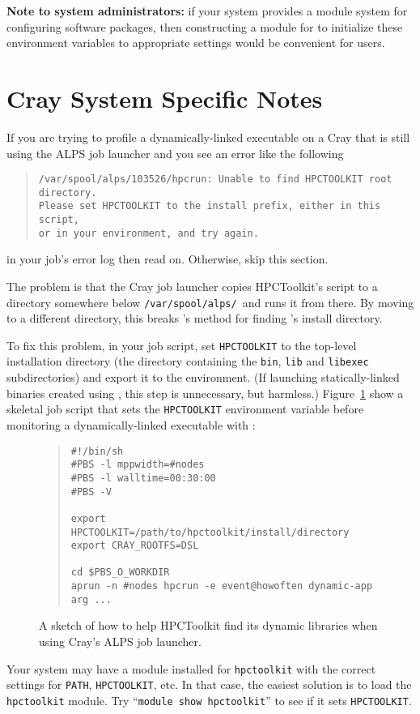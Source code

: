 {\bf Note to system administrators:} if your system provides a module system for configuring 
software packages, then constructing
a module for \HPCToolkit{} to initialize these environment variables to appropriate settings
would be convenient for users.

\section{Cray System Specific Notes}
\label{sec:platform-specific}

%
%

If you are trying to profile a dynamically-linked executable on a Cray that is still using the ALPS job launcher and you see an error like the following 

\begin{quote}
\begin{verbatim}
/var/spool/alps/103526/hpcrun: Unable to find HPCTOOLKIT root directory.
Please set HPCTOOLKIT to the install prefix, either in this script,
or in your environment, and try again.
\end{verbatim}
\end{quote}

\noindent 
in your job's error log then read on. Otherwise, skip this section.

The problem is that the Cray job launcher copies HPCToolkit's \hpcrun{}
script to a directory somewhere below \verb|/var/spool/alps/|\ and runs
it from there.  By moving \hpcrun{} to a different directory, this
breaks \hpcrun{}'s method for finding \HPCToolkit{}'s install directory.

To fix this problem, in your job script, set \verb|HPCTOOLKIT| to the top-level \HPCToolkit{} installation directory
(the directory containing the \verb|bin|, \verb|lib| and
\verb|libexec| subdirectories) and export it to the environment.  
(If launching statically-linked binaries created using \hpclink{}, this step is unnecessary, but harmless.)
Figure~\ref{cray-alps} show a skeletal job script that sets the \verb|HPCTOOLKIT| environment variable  before monitoring 
a dynamically-linked executable with \hpcrun{}: 

\begin{figure}
\begin{quote}
\begin{verbatim}
#!/bin/sh
#PBS -l mppwidth=#nodes
#PBS -l walltime=00:30:00
#PBS -V

export HPCTOOLKIT=/path/to/hpctoolkit/install/directory
export CRAY_ROOTFS=DSL

cd $PBS_O_WORKDIR
aprun -n #nodes hpcrun -e event@howoften dynamic-app arg ...
\end{verbatim}
\end{quote}
\caption{A sketch of how to help HPCToolkit find its dynamic libraries when using Cray's ALPS job launcher.} 
\label{cray-alps}
\end{figure}

Your system may have a module installed for \verb|hpctoolkit| with the
correct settings for \verb|PATH|, \verb|HPCTOOLKIT|, etc.  In that case,
the easiest solution is to load the \verb|hpctoolkit| module.  Try
``\verb|module show hpctoolkit|'' to see if it sets \verb|HPCTOOLKIT|.

